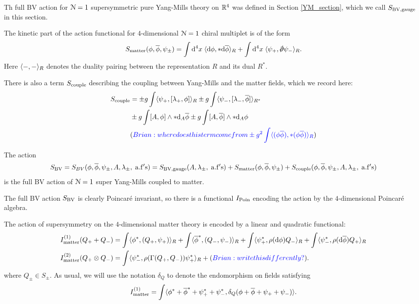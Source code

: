 \documentclass[10pt, oneside]{article}
\begin{document}
Th full BV action for $\cN=1$ supersymmetric pure Yang-Mills theory on $\RR^4$ was defined in Section \ref{YM_section}, which we call $S_{\rm BV, gauge}$ in this section.

The kinetic part of the action functional for $4$-dimensional $\mc N = 1$ chiral multiplet is of the form
\[
S_{\rm matter} (\phi, \Bar{\phi}, \psi_{\pm}) = \int \d^4 x \; \<\d \phi , * \d \Bar{\phi}\>_R + \int \d^4 x \; \<\psi_+ , \sd \dd \psi_-\>_R .
\]
Here $\<-,-\>_R$ denotes the duality pairing between the representation $R$ and its dual $R^*$. 

There is also a term $S_{\rm couple}$ describing the coupling between Yang-Mills and the matter fields, which we record here:
\begin{align*}
S_{\rm couple} & = \pm g \int \<\psi_+, [\lambda_+, \phi]\>_R \pm g \int \<\psi_-, [\lambda_-, \Bar{\phi}]\>_{R^*} \\
& \pm g \int [A, \phi] \wedge * \d_{A} \Bar{\phi} \pm g \int [A, \Bar{\phi}] \wedge * \d_A \phi \\
&\brian{where does this term come from \pm g^2 \int \<(\phi \Bar{\phi}), * (\phi \Bar{\phi})\>_R}
\end{align*}

The action
\[
S_{\rm BV} = S_{BV}(\phi, \Bar{\phi}, \psi_\pm , A, \lambda_\pm, \; {\rm a.f's}) = S_{\rm BV, gauge}(A, \lambda_\pm, \; {\rm a.f's}) + S_{\rm matter}(\phi, \Bar{\phi}, \psi_\pm) + S_{\rm couple} (\phi, \Bar{\phi}, \psi_\pm , A, \lambda_\pm, \; {\rm a.f's}) 
\]
is the full BV action of $\mc N = 1$ super Yang-Mills coupled to matter.

The full BV action $S_{\rm BV}$ is clearly Poincar\'{e} invariant, so there is a functional $I_{\rm Poin}$ encoding the action by the $4$-dimensional Poincar\'{e} algebra.

The action of supersymmetry on the $4$-dimensional matter theory is encoded by a linear and quadratic functional:
\begin{align*}
I^{(1)}_{\rm matter} (Q_+ + Q_-) & = \int \<\phi^*, (Q_+, \psi_+)\>_R + \int \<\Bar{\phi}^*, (Q_-, \psi_-)\>_R + \int \<\psi^*_+, \rho(\d \phi) Q_- \>_R + \int \<\psi_-^*, \rho(\d \Bar{\phi}) Q_+\>_R \\
I^{(2)}_{\rm matter} (Q_+ \otimes Q_-) & = \int \<\psi^*_- , \rho(\Gamma(Q_+, Q_-)) \psi_+^*\>_R + \brian{write this differently?}.
\end{align*}
where $Q_\pm \in S_{\pm}$. 
As usual, we will use the notation $\delta_Q$ to denote the endomorphism on fields satisfying
\[
I^{(1)}_{\rm matter} = \int \<\phi^* + \Bar{\phi}^* + \psi^*_+ + \psi_-^*, \delta_Q(\phi + \Bar{\phi} + \psi_+ + \psi_-) \> .
\]
\end{document}
